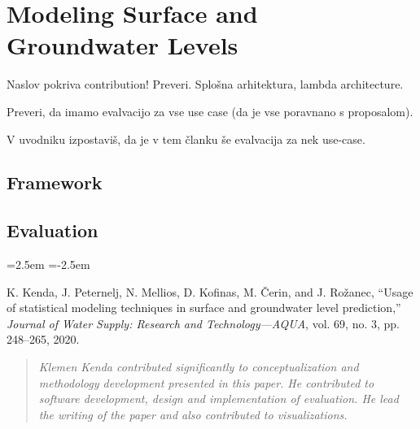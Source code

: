 % 
\chapter{Modeling Surface and Groundwater Levels}
\label{ch:big_data_framework}

Naslov pokriva contribution! Preveri. 
Splošna arhitektura, lambda architecture.

Preveri, da imamo evalvacijo za vse use case (da je vse poravnano s proposalom).

V uvodniku izpostaviš, da je v tem članku še evalvacija za nek use-case.

\section{Framework}

\section{Evaluation}


\begin{list}{}
{\leftmargin=2.5em \itemindent=-2.5em}
    \item K. Kenda, J. Peternelj, N. Mellios, D. Kofinas, M. Čerin, and J. Rožanec, “Usage of statistical modeling techniques in surface and groundwater level prediction,” \textit{Journal of Water Supply: Research and Technology—AQUA}, vol. 69, no. 3, pp. 248–265, 2020.
\end{list}

\begin{quote}
    \textit{Klemen Kenda contributed significantly to conceptualization and methodology development presented in this paper. 
    He contributed to software development, design and implementation of evaluation.
    He lead the writing of the paper and also contributed to visualizations.}
\end{quote}

